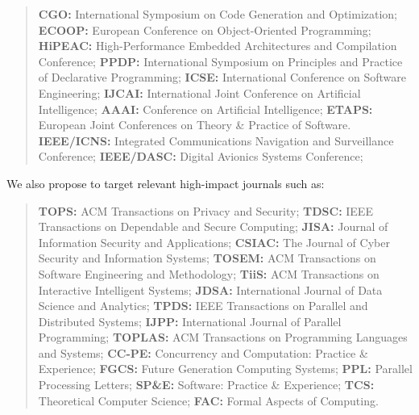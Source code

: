 \documentclass[a4paper,11pt]{article}
\begin{document}
\begin{quote}
\textbf{CGO: } International Symposium on Code Generation and Optimization;
\textbf{ ECOOP: } European Conference on Object-Oriented Programming;
\textbf{HiPEAC: } High-Performance Embedded Architectures and Compilation Conference;
\textbf{PPDP: } International Symposium on
Principles and Practice of Declarative Programming;
\textbf{ICSE: } International Conference on Software Engineering;
\textbf{IJCAI:} International Joint Conference on Artificial Intelligence;
\textbf{AAAI:} Conference on Artificial Intelligence;
\textbf{ETAPS:} European Joint Conferences on Theory \& Practice of Software.
\textbf{IEEE/ICNS:} Integrated Communications Navigation and Surveillance Conference;
\textbf{IEEE/DASC:} Digital Avionics Systems Conference;

 \end{quote}

\noindent
We also propose to target relevant high-impact journals such as:
\begin{quote}
\textbf{TOPS:} ACM Transactions on Privacy and Security;
\textbf{TDSC:} IEEE Transactions on Dependable and Secure Computing;
\textbf{JISA:} Journal of Information Security and Applications;
\textbf{CSIAC:} The Journal of Cyber Security and Information Systems;
\textbf{TOSEM:} ACM Transactions on Software Engineering and Methodology;
\textbf{TiiS:} ACM Transactions on Interactive Intelligent Systems;
\textbf{JDSA:} International Journal of Data Science and Analytics;
\textbf{TPDS:} IEEE Transactions on Parallel and Distributed Systems;
\textbf{IJPP:} International Journal of Parallel Programming;
\textbf{TOPLAS: } ACM Transactions on Programming Languages and Systems;
\textbf{CC-PE: } Concurrency and Computation: Practice \& Experience;
\textbf{FGCS: } Future Generation Computing Systems;
\textbf{PPL: } Parallel Processing Letters; 
\textbf{SP\&E: } Software: Practice \& Experience; 
\textbf{TCS:} Theoretical Computer Science;
\textbf{FAC:} Formal Aspects of Computing.
\end{quote}
\end{document}
